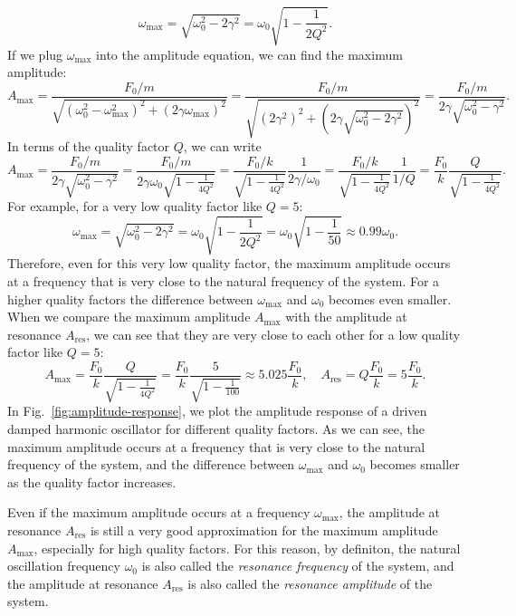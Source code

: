 \documentclass[12pt]{article}
\begin{document}
\begin{enumerate}
    \begin{equation}
        \omega_\text{max}=\sqrt{\omega_0^2-2\gamma^2}=\omega_0\sqrt{1-\frac{1}{2Q^2}}.
    \end{equation}
    If we plug $\omega_\text{max}$ into the amplitude equation, we can find the maximum amplitude:
    \begin{equation}
        A_\text{max}=\frac{F_0/m}{\sqrt{(\omega_0^2-\omega_\text{max}^2)^2+(2\gamma\omega_\text{max})^2}}=\frac{F_0/m}{\sqrt{(2\gamma^2)^2+(2\gamma\sqrt{\omega_0^2-2\gamma^2})^2}}=\frac{F_0/m}{2\gamma\sqrt{\omega_0^2-\gamma^2}}.
    \end{equation}
    In terms of the quality factor $Q$, we can write
    \begin{equation}
        A_\text{max}=\frac{F_0/m}{2\gamma\sqrt{\omega_0^2-\gamma^2}}=\frac{F_0/m}{2\gamma\omega_0\sqrt{1-\frac{1}{4Q^2}}}=\frac{F_0/k}{\sqrt{1-\frac{1}{4Q^2}}}\frac{1}{2\gamma/\omega_0}=\frac{F_0/k}{\sqrt{1-\frac{1}{4Q^2}}}\frac{1}{1/Q}=\frac{F_0}{k}\frac{Q}{\sqrt{1-\frac{1}{4Q^2}}}.
    \end{equation}
    For example, for a very low quality factor like $Q=5$:
    \begin{equation}
        \omega_\text{max}=\sqrt{\omega_0^2-2\gamma^2}=\omega_0\sqrt{1-\frac{1}{2Q^2}}=\omega_0\sqrt{1-\frac{1}{50}}\approx 0.99\omega_0.
    \end{equation}
    Therefore, even for this very low quality factor, the maximum amplitude occurs at a frequency that is very close to the natural frequency of the system. For a higher quality factors the difference between $\omega_\text{max}$ and $\omega_0$ becomes even smaller. When we compare the maximum amplitude $A_\text{max}$ with the amplitude at resonance $A_\text{res}$, we can see that they are very close to each other for a low quality factor like $Q=5$:
    \begin{equation}
        A_\text{max}=\frac{F_0}{k}\frac{Q}{\sqrt{1-\frac{1}{4Q^2}}}=\frac{F_0}{k}\frac{5}{\sqrt{1-\frac{1}{100}}}\approx 5.025\frac{F_0}{k}, \quad A_\text{res}=Q\frac{F_0}{k}=5\frac{F_0}{k}.
    \end{equation}
    In Fig.~\ref{fig:amplitude-response}, we plot the amplitude response of a driven damped harmonic oscillator for different quality factors. As we can see, the maximum amplitude occurs at a frequency that is very close to the natural frequency of the system, and the difference between $\omega_\text{max}$ and $\omega_0$ becomes smaller as the quality factor increases.

    Even if the maximum amplitude occurs at a frequency $\omega_\text{max}$, the amplitude at resonance $A_\text{res}$ is still a very good approximation for the maximum amplitude $A_\text{max}$, especially for high quality factors. For this reason, by definiton, the natural oscillation frequency $\omega_0$ is also called the \emph{resonance frequency} of the system, and the amplitude at resonance $A_\text{res}$ is also called the \emph{resonance amplitude} of the system. 
\end{enumerate}
\end{document}
